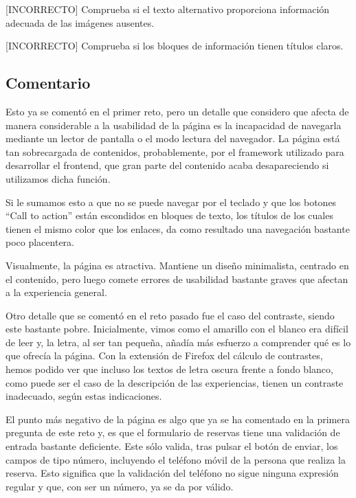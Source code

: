 \documentclass[spanish]{article}
\begin{document}
[INCORRECTO] Comprueba si el texto alternativo proporciona información adecuada
de las imágenes ausentes.\newline

[INCORRECTO] Comprueba si los bloques de información tienen títulos
claros.

\subsection{Comentario}

Esto ya se comentó en el primer reto, pero un detalle que considero que afecta
de manera considerable a la usabilidad de la página es la incapacidad de
navegarla mediante un lector de pantalla o el modo lectura del navegador. La
página está tan sobrecargada de contenidos, probablemente, por el framework
utilizado para desarrollar el frontend, que gran parte del contenido acaba
desapareciendo si utilizamos dicha función.\newline

Si le sumamos esto a que no se puede navegar por el teclado y que los botones
``Call to action'' están escondidos en bloques de texto, los títulos de los
cuales tienen el mismo color que los enlaces, da como resultado una navegación
bastante poco placentera.\newline

Visualmente, la página es atractiva. Mantiene un diseño minimalista, centrado en
el contenido, pero luego comete errores de usabilidad bastante graves que
afectan a la experiencia general.\newline

Otro detalle que se comentó en el reto pasado fue el caso del contraste, siendo
este bastante pobre. Inicialmente, vimos como el amarillo con el blanco era
difícil de leer y, la letra, al ser tan pequeña, añadía más esfuerzo a
comprender qué es lo que ofrecía la página. Con la extensión de Firefox del
cálculo de contrastes, hemos podido ver que incluso los textos de letra oscura
frente a fondo blanco, como puede ser el caso de la descripción de las
experiencias, tienen un contraste inadecuado, según estas indicaciones.\newline

El punto más negativo de la página es algo que ya se ha comentado en la primera
pregunta de este reto y, es que el formulario de reservas tiene una validación
de entrada bastante deficiente. Este sólo valida, tras pulsar el botón de
enviar, los campos de tipo número, incluyendo el teléfono móvil de la persona
que realiza la reserva. Esto significa que la validación del teléfono no sigue
ninguna expresión regular y que, con ser un número, ya se da por válido.\newline
\end{document}
